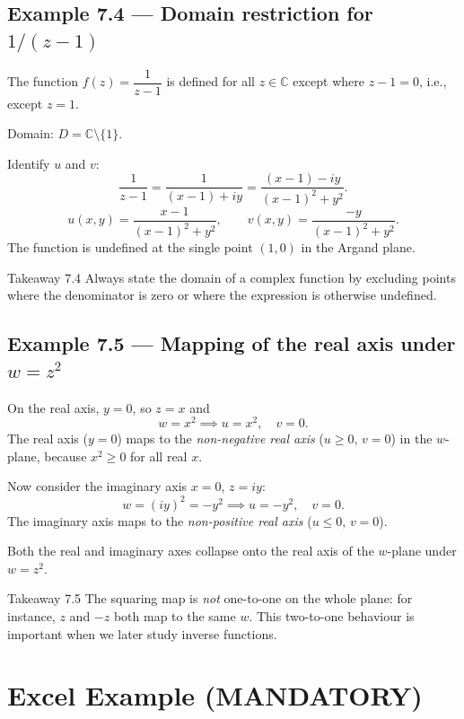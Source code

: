 \documentclass[12pt,a4paper]{article}
\begin{document}
\subsection*{Example 7.4 --- Domain restriction for \(1/(z-1)\)}

The function \(f(z) = \dfrac{1}{z-1}\) is defined for all \(z \in \mathbb{C}\)
except where \(z - 1 = 0\), i.e., except \(z = 1\).

Domain: \(D = \mathbb{C} \setminus \{1\}\).

Identify \(u\) and \(v\):
\[
  \frac{1}{z-1} = \frac{1}{(x-1)+iy}
    = \frac{(x-1)-iy}{(x-1)^2+y^2}.
\]
\[
  u(x,y) = \frac{x-1}{(x-1)^2+y^2}, \qquad
  v(x,y) = \frac{-y}{(x-1)^2+y^2}.
\]
The function is undefined at the single point \((1,0)\) in the Argand plane.

\begin{learnbox}{Takeaway 7.4}
Always state the domain of a complex function by excluding points where the
denominator is zero or where the expression is otherwise undefined.
\end{learnbox}

\subsection*{Example 7.5 --- Mapping of the real axis under \(w=z^2\)}

On the real axis, \(y=0\), so \(z=x\) and
\[
  w = x^2 \implies u = x^2,\quad v = 0.
\]
The real axis (\(y=0\)) maps to the \emph{non-negative real axis} (\(u\geq0,\,v=0\))
in the \(w\)-plane, because \(x^2 \geq 0\) for all real \(x\).

Now consider the imaginary axis \(x=0\), \(z=iy\):
\[
  w = (iy)^2 = -y^2 \implies u = -y^2,\quad v=0.
\]
The imaginary axis maps to the \emph{non-positive real axis} (\(u\leq0,\,v=0\)).

Both the real and imaginary axes collapse onto the real axis of the
\(w\)-plane under \(w=z^2\).

\begin{learnbox}{Takeaway 7.5}
The squaring map is \emph{not} one-to-one on the whole plane: for instance,
\(z\) and \(-z\) both map to the same \(w\).  This two-to-one behaviour
is important when we later study inverse functions.
\end{learnbox}

\section{Excel Example (MANDATORY)}
\end{document}
